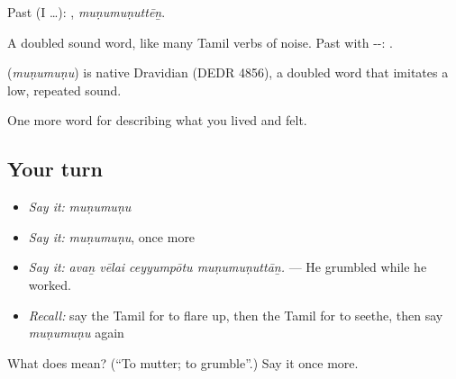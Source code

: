 Past (I …): , \emph{muṇumuṇuttēṉ}.

A doubled sound word, like many Tamil verbs of noise. Past with --: .

\begin{cousinweb}
\textbf{} (\emph{muṇumuṇu}) is native Dravidian (DEDR 4856), a doubled word that imitates a low, repeated sound.
\end{cousinweb}

\begin{grammarlens}[title={What you've built}]
One more word for describing what you lived and felt.
\end{grammarlens}

\subsection*{Your turn}
\begin{itemize}
\raggedright
  \item \emph{Say it:} \emph{muṇumuṇu}
  \item \emph{Say it:} \emph{muṇumuṇu}, once more
  \item \emph{Say it:} \emph{avaṉ vēlai ceyyumpōtu muṇumuṇuttāṉ.} — He grumbled while he worked.
  \item \emph{Recall:} say the Tamil for to flare up, then the Tamil for to seethe, then say \emph{muṇumuṇu} again
\end{itemize}

\begin{tcolorbox}[breakable,colback=teal!4,colframe=teal!35!black,title={Before you move on}]
What does  mean? (\textquotedblleft{}To mutter; to grumble\textquotedblright{}.) Say it once more.
\end{tcolorbox}
